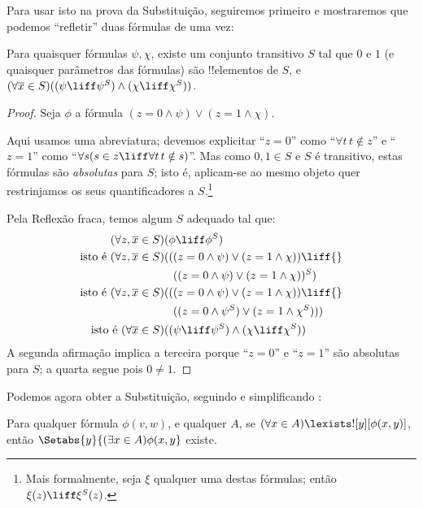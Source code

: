 \documentclass[../../../include/open-logic-section]{subfiles}
\begin{document}
Para usar isto na prova da Substituição, seguiremos primeiro \citet[primeira parte do Teorema 2]{Levy1960} e mostraremos que podemos ``refletir'' duas
fórmulas de uma vez:

\begin{lem}
Para quaisquer fórmulas $\psi, \chi$, existe um conjunto transitivo $S$ tal que
$0$ e $1$ (e quaisquer parâmetros das fórmulas) são !!{element}os de
$S$, e $(\forall \overline{x} \in S)((\psi \liff \psi^S) \land (\chi
\liff \chi^S))$.
\end{lem}

\begin{proof}
Seja $\phi$ a fórmula $(z = 0 \land \psi) \lor (z = 1 \land \chi)$. 

Aqui usamos uma abreviatura; devemos explicitar ``$z = 0$'' como
``$\forall t\, t \notin z$'' e ``$z =1$'' como ``$\forall s(s \in z
\liff \forall t\, t \notin s)$''. Mas como $0, 1 \in S$ e $S$ é
transitivo, estas fórmulas são \emph{absolutas} para $S$; isto é, aplicam-se ao mesmo objeto quer restrinjamos os seus quantificadores a
$S$.\footnote{Mais formalmente, seja $\xi$ qualquer uma destas
fórmulas; então $\xi(z) \liff \xi^S(z)$.}

Pela Reflexão fraca, temos algum $S$ adequado tal que:
\begin{align*}
	(\forall z, \overline{x} \in S)(&\phi \liff \phi^S)\\
	\text{isto é }(\forall z, \overline{x} \in S)(&((z = 0 \land \psi) \lor (z = 1 \land \chi)) \liff {}\\
	&\phantom{(}((z = 0 \land \psi) \lor (z = 1 \land \chi))^S)\\
	\text{isto é }(\forall z, \overline{x} \in S)(&((z = 0 \land \psi) \lor (z = 1 \land \chi))\liff {}\\
	&\phantom{(}((z = 0 \land \psi^S) \lor (z = 1 \land \chi^S)))\\
	\text{isto é }(\forall \overline{x} \in S)(&(\psi \liff \psi^S) \land (\chi \liff \chi^S))
\end{align*}
A segunda afirmação implica a terceira porque ``$z = 0$'' e ``$z=1$''
são absolutas para $S$; a quarta segue pois $0 \neq 1$.
\end{proof}\noindent Podemos agora obter a Substituição, seguindo e simplificando 
\citet[Teorema 6]{Levy1960}:

\begin{thm}\label{thm:replacement} 
Para qualquer fórmula $\phi(v,w)$, e qualquer $A$, se $(\forall x \in A)\lexists![y][\phi(x,y)]$, então
$\Setabs{y}{(\exists x \in A)\phi(x,y}$ existe.
\end{thm}
\end{document}
